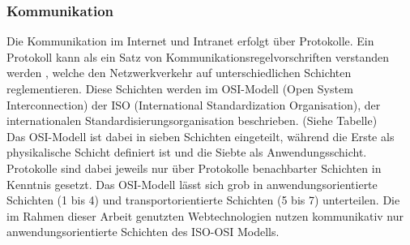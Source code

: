\subsubsection{Kommunikation}\label{sec:kommunikation}
Die Kommunikation im Internet und Intranet erfolgt über Protokolle. 
Ein Protokoll kann als ein Satz von Kommunikationsregelvorschriften verstanden werden \cite{safran2011webtechnologien:article}, welche den Netzwerkverkehr auf unterschiedlichen Schichten reglementieren. 
Diese Schichten werden im OSI-Modell (Open System Interconnection) der ISO (International Standardization Organisation), der internationalen Standardisierungsorganisation beschrieben. (Siehe Tabelle) %
\\ 
Das OSI-Modell ist dabei in sieben Schichten eingeteilt, während die Erste als physikalische Schicht definiert ist und die Siebte als Anwendungsschicht. Protokolle sind dabei jeweils nur über Protokolle benachbarter Schichten in Kenntnis gesetzt. Das OSI-Modell lässt sich grob in anwendungsorientierte Schichten (1 bis 4) und transportorientierte Schichten (5 bis 7) unterteilen. Die im Rahmen dieser Arbeit genutzten Webtechnologien nutzen kommunikativ nur anwendungsorientierte Schichten des ISO-OSI Modells.



